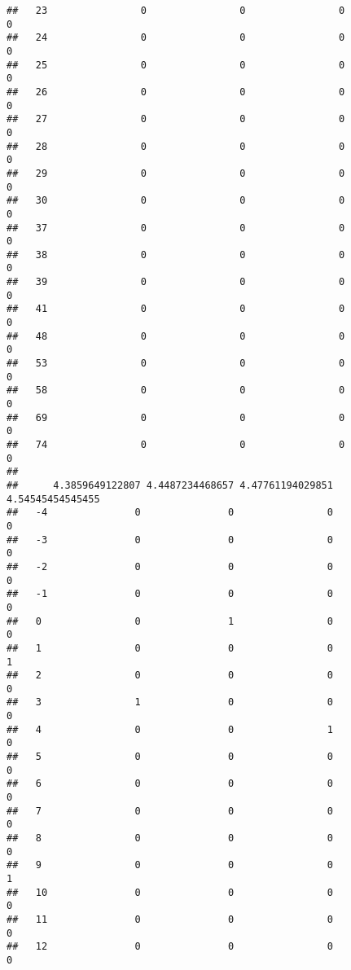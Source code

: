\documentclass[]{article}
\begin{document}
\begin{verbatim}
##   23                0                0                0                0
##   24                0                0                0                0
##   25                0                0                0                0
##   26                0                0                0                0
##   27                0                0                0                0
##   28                0                0                0                0
##   29                0                0                0                0
##   30                0                0                0                0
##   37                0                0                0                0
##   38                0                0                0                0
##   39                0                0                0                0
##   41                0                0                0                0
##   48                0                0                0                0
##   53                0                0                0                0
##   58                0                0                0                0
##   69                0                0                0                0
##   74                0                0                0                0
##     
##      4.3859649122807 4.4487234468657 4.47761194029851 4.54545454545455
##   -4               0               0                0                0
##   -3               0               0                0                0
##   -2               0               0                0                0
##   -1               0               0                0                0
##   0                0               1                0                0
##   1                0               0                0                1
##   2                0               0                0                0
##   3                1               0                0                0
##   4                0               0                1                0
##   5                0               0                0                0
##   6                0               0                0                0
##   7                0               0                0                0
##   8                0               0                0                0
##   9                0               0                0                1
##   10               0               0                0                0
##   11               0               0                0                0
##   12               0               0                0                0

\end{verbatim}
\end{document}

